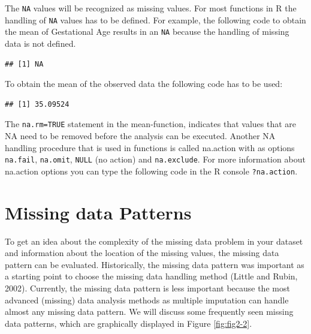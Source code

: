\documentclass[]{book}
\newenvironment{Shaded}{\begin{snugshade}}{\end{snugshade}}
\newcommand{\KeywordTok}[1]{\textcolor[rgb]{0.13,0.29,0.53}{\textbf{#1}}}
\newcommand{\DataTypeTok}[1]{\textcolor[rgb]{0.13,0.29,0.53}{#1}}
\newcommand{\OtherTok}[1]{\textcolor[rgb]{0.56,0.35,0.01}{#1}}
\newcommand{\OperatorTok}[1]{\textcolor[rgb]{0.81,0.36,0.00}{\textbf{#1}}}
\newcommand{\NormalTok}[1]{#1}
\theoremstyle{definition}
\theoremstyle{definition}
\theoremstyle{definition}
\theoremstyle{remark}
\begin{document}
The \texttt{NA} values will be recognized as missing values. For most
functions in R the handling of \texttt{NA} values has to be defined. For
example, the following code to obtain the mean of Gestational Age
results in an \texttt{NA} because the handling of missing data is not
defined.

\begin{Shaded}
\end{Shaded}

\begin{verbatim}
## [1] NA
\end{verbatim}

To obtain the mean of the observed data the following code has to be
used:

\begin{Shaded}
\end{Shaded}

\begin{verbatim}
## [1] 35.09524
\end{verbatim}

The \texttt{na.rm=TRUE} statement in the mean-function, indicates that
values that are NA need to be removed before the analysis can be
executed. Another NA handling procedure that is used in functions is
called na.action with as options \texttt{na.fail}, \texttt{na.omit},
\texttt{NULL} (no action) and \texttt{na.exclude}. For more information
about na.action options you can type the following code in the R console
\texttt{?na.action}.

\section{Missing data Patterns}\label{missing-data-patterns}

To get an idea about the complexity of the missing data problem in your
dataset and information about the location of the missing values, the
missing data pattern can be evaluated. Historically, the missing data
pattern was important as a starting point to choose the missing data
handling method (Little and Rubin, 2002). Currently, the missing data
pattern is less important because the most advanced (missing) data
analysis methods as multiple imputation can handle almost any missing
data pattern. We will discuss some frequently seen missing data
patterns, which are graphically displayed in Figure \ref{fig:fig2-2}.
\end{document}
